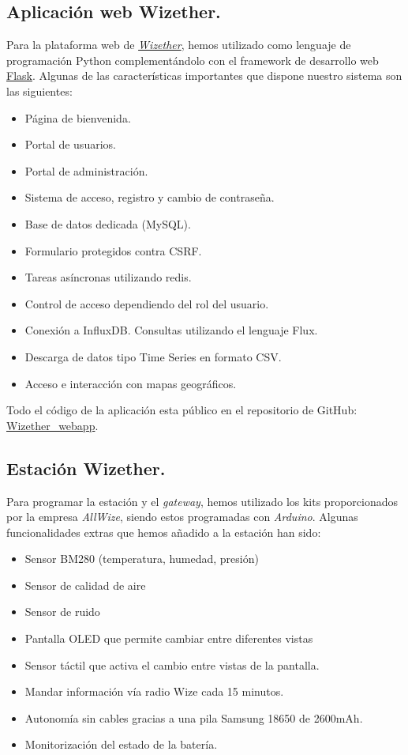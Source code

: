 \documentclass[12pt]{article}
\begin{document}
\subsection{Aplicación web Wizether.}
\noindent Para la plataforma web de \href{https://wizether.ranii.pro/}{\textit{Wizether}}, hemos utilizado como lenguaje de programación Python complementándolo con el framework de desarrollo web \href{https://flask.palletsprojects.com/en/1.1.x/}{Flask}. Algunas de las características importantes que dispone nuestro sistema son las siguientes:
\begin{itemize}
	\item Página de bienvenida.
	\item Portal de usuarios.
	\item Portal de administración.
	\item Sistema de acceso, registro y cambio de contraseña.
	\item Base de datos dedicada (MySQL).
	\item Formulario protegidos contra CSRF.
	\item Tareas asíncronas utilizando redis.
	\item Control de acceso dependiendo del rol del usuario.
	\item Conexión a InfluxDB. Consultas utilizando el lenguaje Flux.
	\item Descarga de datos tipo Time Series en formato CSV.
	\item Acceso e interacción con mapas geográficos.
\end{itemize}

\noindent Todo el código de la aplicación esta público en el repositorio de GitHub: \href{https://github.com/Raniita/wizether_webapp}{Wizether\_webapp}.\\

\subsection{Estación Wizether.}
Para programar la estación y el \textit{gateway}, hemos utilizado los kits proporcionados por la empresa \textit{AllWize}, siendo estos programadas con \textit{Arduino}. Algunas funcionalidades extras que hemos añadido a la estación han sido:
\begin{itemize}
	\item Sensor BM280 (temperatura, humedad, presión)
	\item Sensor de calidad de aire
	\item Sensor de ruido
	\item Pantalla OLED que permite cambiar entre diferentes vistas
	\item Sensor táctil que activa el cambio entre vistas de la pantalla.
	\item Mandar información vía radio Wize cada 15 minutos.
	\item Autonomía sin cables gracias a una pila Samsung 18650 de 2600mAh.
	\item Monitorización del estado de la batería.
\end{itemize}
\end{document}
